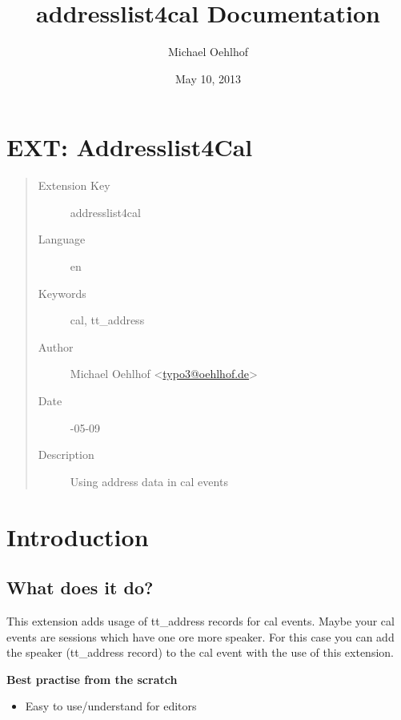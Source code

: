 \documentclass[a4paper,10pt,english]{sphinxtypo3manual}
\title{addresslist4cal Documentation}
\date{May 10, 2013}
\author{Michael Oehlhof}
\begin{document}
\maketitle
\tableofcontents
{}\label{index::doc}



\chapter{EXT: Addresslist4Cal}
\label{index:ext-addresslist4cal}\label{index:welcome-to-addresslist4cal-s-documentation}\begin{quote}\begin{description}
\item[{Extension Key}] \leavevmode
addresslist4cal

\item[{Language}] \leavevmode
en

\item[{Keywords}] \leavevmode
cal, tt\_address

\item[{Author}] \leavevmode
Michael Oehlhof \textless{}\href{mailto:typo3@oehlhof.de}{typo3@oehlhof.de}\textgreater{}

\item[{Date}] -05-09

\item[{Description}] \leavevmode
Using address data in cal events

\end{description}\end{quote}


\chapter{Introduction}
\label{index:introduction}

\section{What does it do?}
\label{index:what-does-it-do}
This extension adds usage of tt\_address records for cal events.
Maybe your cal events are sessions which have one ore more speaker.
For this case you can add the speaker (tt\_address record) to the cal event
with the use of this extension.

\textbf{Best practise from the scratch}
\begin{itemize}
\item {} 
Easy to use/understand for editors

\end{itemize}
\end{document}

